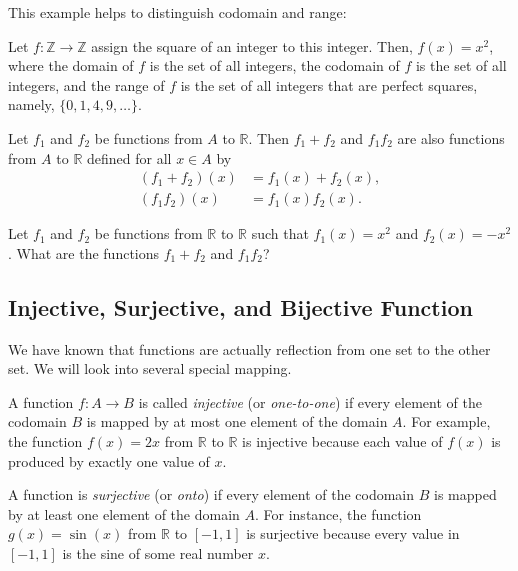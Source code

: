 \documentclass[
	12pt, %
	fleqn, %
	a4paper, %
]{LegrandOrangeBook}
\begin{document}
This example helps to distinguish codomain and range:
\begin{example}
    Let \( f: \mathbb{Z} \rightarrow \mathbb{Z} \) assign the square of an integer to this integer. Then, \( f(x) = x^2 \), where the domain of \( f \) is the set of all integers, the codomain of \( f \) is the set of all integers, and the range of \( f \) is the set of all integers that are perfect squares, namely, \( \{0, 1, 4, 9, \ldots \} \).
\end{example}

\begin{theorem}
Let \( f_1 \) and \( f_2 \) be functions from \( A \) to \( \mathbb{R} \). Then \( f_1 + f_2 \) and \( f_1f_2 \) are also functions from \( A \) to \( \mathbb{R} \) defined for all \( x \in A \) by
\begin{align*}
    (f_1 + f_2)(x) &= f_1(x) + f_2(x), \\
    (f_1f_2)(x) &= f_1(x)f_2(x).
\end{align*}
\end{theorem}
\begin{problem}
    Let \( f_1 \) and \( f_2 \) be functions from \( \mathbb{R} \) to \( \mathbb{R} \) such that \( f_1(x) = x^2 \) and \( f_2(x) = -x^2 \). What are the functions \( f_1 + f_2 \) and \( f_1f_2 \)?
\end{problem}

\subsection{Injective, Surjective, and Bijective Function}
We have known that functions are actually reflection from one set to the other set. We will look into several special mapping.

\begin{definition}
    A function \( f: A \to B \) is called \emph{injective} (or \emph{one-to-one}) if every element of the codomain \( B \) is mapped by at most one element of the domain \( A \). For example, the function \( f(x) = 2x \) from \( \mathbb{R} \) to \( \mathbb{R} \) is injective because each value of \( f(x) \) is produced by exactly one value of \( x \).
\end{definition}

\begin{definition}
    A function is \emph{surjective} (or \emph{onto}) if every element of the codomain \( B \) is mapped by at least one element of the domain \( A \). For instance, the function \( g(x) = \sin(x) \) from \( \mathbb{R} \) to \( [-1, 1] \) is surjective because every value in \( [-1, 1] \) is the sine of some real number \( x \).
\end{definition}
\end{document}
